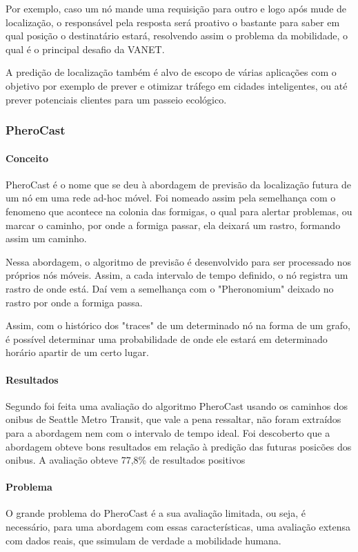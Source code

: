 \documentclass[12pt, %
openright, 
oneside,
a4paper,
brazil]{facom-ufu-abntex2}
\begin{document}
Por exemplo, caso um nó mande uma requisição para outro e logo após mude de localização, o responsável pela resposta será proativo o bastante para saber em qual posição o destinatário estará, resolvendo assim o problema da mobilidade, o qual é o principal desafio da VANET.

A predição de localização também é alvo de escopo de várias aplicações com o objetivo por exemplo de prever e otimizar tráfego em cidades inteligentes, ou até prever potenciais clientes para um passeio ecológico.

\subsubsection{PheroCast}
\paragraph{Conceito}
PheroCast é o nome que se deu à abordagem de previsão da localização futura de um nó em uma rede ad-hoc móvel. Foi nomeado assim pela semelhança com o fenomeno que acontece na colonia das formigas, o qual para alertar problemas, ou marcar o caminho, por onde a formiga passar, ela deixará um rastro, formando assim um caminho.

Nessa abordagem, o algoritmo de previsão é desenvolvido para ser processado nos próprios nós móveis. Assim, a cada intervalo de tempo definido, o nó registra um rastro de onde está. Daí vem a semelhança com o "Pheronomium" deixado no rastro por onde a formiga passa.

Assim, com o histórico dos "traces" de um determinado nó na forma de um grafo, é possível determinar uma probabilidade de onde ele estará em determinado horário apartir de um certo lugar.
\paragraph{Resultados}
Segundo \cite{6838650} foi feita uma avaliação do algoritmo PheroCast usando os caminhos dos onibus de Seattle Metro Transit, que vale a pena ressaltar, não foram extraídos para a abordagem nem com o intervalo de tempo ideal. Foi descoberto que a abordagem obteve bons resultados em relação à predição das futuras posicões dos onibus. A avaliação obteve 77,8\% de resultados positivos
\paragraph{Problema}
O grande problema do PheroCast é a sua avaliação limitada, ou seja, é necessário, para uma abordagem com essas características, uma avaliação extensa com dados reais, que ssimulam de verdade a mobilidade humana. 
\end{document}
